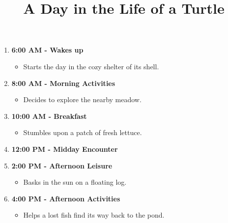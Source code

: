 \documentclass{article}
\title{A Day in the Life of a Turtle}
\date{}
\begin{document}
\maketitle

\begin{enumerate}
\item \textbf{6:00 AM - Wakes up}
\begin{itemize}
\item Starts the day in the cozy shelter of its shell.
\end{itemize}
\item \textbf{8:00 AM - Morning Activities}
\begin{itemize}
\item Decides to explore the nearby meadow.
\end{itemize}
\item \textbf{10:00 AM - Breakfast}
\begin{itemize}
\item Stumbles upon a patch of fresh lettuce.
\end{itemize}
\item \textbf{12:00 PM - Midday Encounter}
\begin{itemize}
\end{itemize}
\item \textbf{2:00 PM - Afternoon Leisure}
\begin{itemize}
\item Basks in the sun on a floating log.
\end{itemize}
\item \textbf{4:00 PM - Afternoon Activities}
\begin{itemize}
\item Helps a lost fish find its way back to the pond.

\end{itemize}
\end{enumerate}
\end{document}
